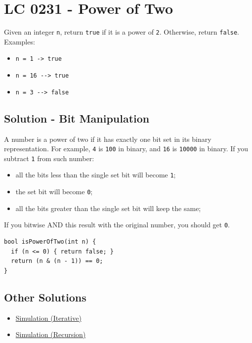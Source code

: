 \section{LC 0231 - Power of Two}\label{lc0231}
Given an integer {\colorbox{CodeBackground}{\lstinline|n|}}, return {\colorbox{CodeBackground}{\lstinline|true|}} if it is a power of {\colorbox{CodeBackground}{\lstinline|2|}}. Otherwise, return {\colorbox{CodeBackground}{\lstinline|false|}}.\\

Examples:
\begin{itemize}
\item {\colorbox{CodeBackground}{\lstinline|n = 1 -> true|}}
\item {\colorbox{CodeBackground}{\lstinline|n = 16 --> true|}}
\item {\colorbox{CodeBackground}{\lstinline|n = 3 --> false|}}
\end{itemize}

\subsection*{Solution - Bit Manipulation}\label{solution:lc0231_bit_manipulation}
A number is a power of two if it has exactly one bit set in its binary representation. For example, {\colorbox{CodeBackground}{\lstinline|4|}} is {\colorbox{CodeBackground}{\lstinline|100|}} in binary, and {\colorbox{CodeBackground}{\lstinline|16|}} is {\colorbox{CodeBackground}{\lstinline|10000|}} in binary. If you subtract {\colorbox{CodeBackground}{\lstinline|1|}} from such number:
\begin{itemize}
\item all the bits less than the single set bit will become {\colorbox{CodeBackground}{\lstinline|1|}};
\item the set bit will become {\colorbox{CodeBackground}{\lstinline|0|}};
\item all the bits greater than the single set bit will keep the same;
\end{itemize}
If you bitwise AND this result with the original number, you should get {\colorbox{CodeBackground}{\lstinline|0|}}.
\begin{lstlisting}
bool isPowerOfTwo(int n) {
  if (n <= 0) { return false; }
  return (n & (n - 1)) == 0;
}
\end{lstlisting}

\subsection*{Other Solutions}
\begin{itemize}
\item \hyperref[solution:lc0231_simulation_iterative]{Simulation (Iterative)}
\item \hyperref[solution:lc0231_simulation_recursion]{Simulation (Recursion)}
\end{itemize}

